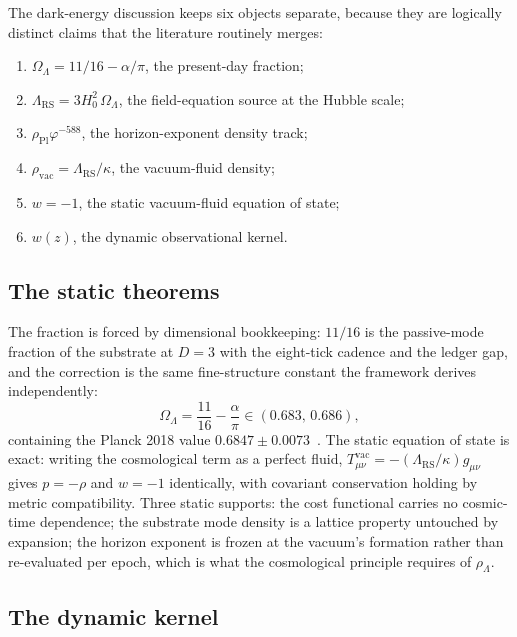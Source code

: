 \documentclass[11pt,letterpaper]{article}
\theoremstyle{definition}
\newcommand{\phiG}{\varphi}
\newcommand{\RS}{\mathrm{RS}}
\newcommand{\Pl}{\mathrm{Pl}}
\begin{document}
The dark-energy discussion keeps six objects separate, because they
are logically distinct claims that the literature routinely merges:
\begin{enumerate}[nosep]
\item $\Omega_\Lambda=11/16-\alpha/\pi$, the present-day fraction;
\item $\Lambda_\RS=3H_0^2\,\Omega_\Lambda$, the field-equation source
at the Hubble scale;
\item $\rho_\Pl\phiG^{-588}$, the horizon-exponent density track;
\item $\rho_{\mathrm{vac}}=\Lambda_\RS/\kappa$, the vacuum-fluid
density;
\item $w=-1$, the static vacuum-fluid equation of state;
\item $w(z)$, the dynamic observational kernel.
\end{enumerate}

\subsection{The static theorems}

The fraction is forced by dimensional bookkeeping: $11/16$ is the
passive-mode fraction of the substrate at $D=3$ with the eight-tick
cadence and the ledger gap, and the correction is the same
fine-structure constant the framework derives independently:
\begin{equation}
\Omega_\Lambda=\frac{11}{16}-\frac{\alpha}{\pi}
\in(0.683,\,0.686),
\end{equation}
containing the Planck 2018 value $0.6847\pm0.0073$~\cite{Planck2018}.
The static equation of state is exact: writing the cosmological term
as a perfect fluid, $T^{\mathrm{vac}}_{\mu\nu}
=-(\Lambda_\RS/\kappa)g_{\mu\nu}$ gives $p=-\rho$ and $w=-1$
identically, with covariant conservation holding by metric
compatibility.  Three static supports: the cost functional carries no
cosmic-time dependence; the substrate mode density is a lattice
property untouched by expansion; the horizon exponent is frozen at the
vacuum's formation rather than re-evaluated per epoch, which is what
the cosmological principle requires of $\rho_\Lambda$.

\subsection{The dynamic kernel}
\label{sec:kernel}
\end{document}
